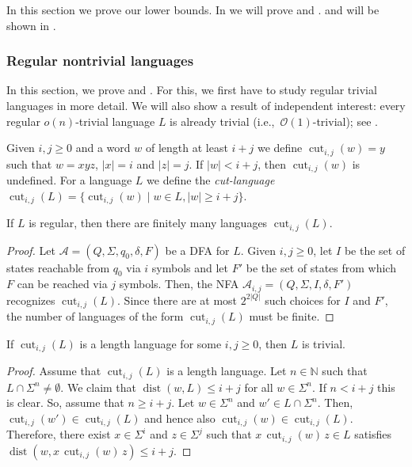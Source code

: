 \documentclass{theoretics}
\newcommand{\N}{\mathbb{N}}
\newcommand{\A}{\mathcal{A}}
\renewcommand{\O}{\mathcal{O}}
\DeclareMathOperator{\dist}{dist}
\DeclareMathOperator{\cut}{cut}
\renewcommand{\geq}{\geqslant}
\renewcommand{\leq}{\leqslant}
\renewcommand{\ge}{\geq}
\renewcommand{\le}{\leq}
\begin{document}
In this section we prove our lower bounds. In  we will prove   and .
 and  will be shown in .



\subsubsection{Regular nontrivial  languages} \label{sec-lb-nontriv}

In this section, we prove  and .
For this, we first have to study regular trivial languages in more detail.
We will also show a result of independent interest: every regular $o(n)$-trivial language $L$ is already trivial (i.e.,~$\O(1)$-trivial); see .

Given $i,j \ge 0$ and a word $w$ of length at least $i+j$ we define
$\cut_{i,j}(w) = y$ such that $w = xyz$, $|x| = i$ and $|z| = j$.
If $|w| < i+j$, then $\cut_{i,j}(w)$ is undefined.
For a language $L$ we define the {\em cut-language} $\cut_{i,j}(L) = \{ \cut_{i,j}(w) \mid w \in L, |w| \ge i+j \}$.

\begin{lemma} \label{lemma-fin-cut-lang}
	If $L$ is regular, then there are finitely many languages $\cut_{i,j}(L)$.
\end{lemma}

\begin{proof}
Let $\A = (Q,\Sigma,q_0,\delta,F)$ be a DFA for $L$.
Given $i,j \ge 0$, let $I$ be the set of states reachable from $q_0$ via $i$ symbols
and let $F'$ be the set of states from which $F$ can be reached via $j$ symbols.
Then, the NFA $\A_{i,j} = (Q,\Sigma,I,\delta,F')$ recognizes $\cut_{i,j}(L)$.
Since there are at most $2^{2|Q|}$ such choices for $I$ and $F'$,
the number of languages of the form $\cut_{i,j}(L)$ must be finite.
\end{proof}

\begin{lemma} \label{cuts}
	If $\cut_{i,j}(L)$ is a length language for some $i,j \ge 0$, then $L$ is trivial.
\end{lemma}

\begin{proof}
	Assume that $\cut_{i,j}(L)$ is a length language.
	Let $n \in \N$ such that $L \cap \Sigma^n \neq \emptyset$.
	We claim that $\dist(w,L) \le i+j$ for all $w \in \Sigma^n$. If $n < i+j$ this is clear.
	So, assume that  $n \ge i+j$. 
	Let $w \in \Sigma^n$ and $w' \in L \cap \Sigma^n$. Then, $\cut_{i,j}(w') \in \cut_{i,j}(L)$
	and hence also $\cut_{i,j}(w) \in \cut_{i,j}(L)$.
	Therefore, there exist $x \in \Sigma^i$ and $z \in \Sigma^j$ such that $x \, \cut_{i,j}(w) \, z \in L$
	satisfies $\dist(w, x \, \cut_{i,j}(w) \, z) \le i+j$.
\end{proof}
\end{document}
